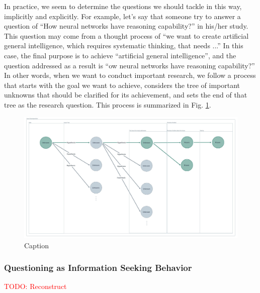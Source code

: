 \documentclass{book}
\begin{document}
In practice, we seem to determine the questions we should tackle in this way, implicitly and explicitly. For example, let's say that someone try to answer a question of ``How neural networks have reasoning capability?'' in his/her study. This question may come from a thought process of ``we want to create artificial general intelligence, which requires systematic thinking, that needs ...'' In this case, the final purpose is to achieve ``artificial general intelligence'', and the question addressed as a result is ``ow neural networks have reasoning capability?'' In other words, when we want to conduct important research, we follow a process that starts with the goal we want to achieve, considers the tree of important unknowns that should be clarified for its achievement, and sets the end of that tree as the research question. This process is summarized in Fig. \ref{fig:unknown_tree}.

\begin{figure}[htb]
    \centering
    \includegraphics[width=\textwidth]{figs/unknown_tree.jpeg}
    \caption{Caption}
    \label{fig:unknown_tree}
\end{figure}


\subsubsection{Questioning as Information Seeking Behavior}
\textcolor{red}{TODO: Reconstruct}
\end{document}
